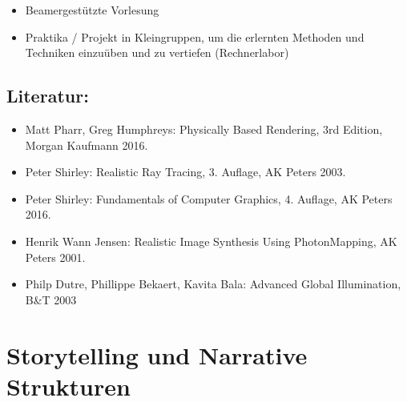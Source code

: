\begin{itemize}
\tightlist
\item
  Beamergestützte Vorlesung
\item
  Praktika / Projekt in Kleingruppen, um die erlernten Methoden und
  Techniken einzuüben und zu vertiefen (Rechnerlabor)
\end{itemize}

\section*{Literatur:\label{/mi-2017/modulbeschreibungen-master/MA_VC_Modul_PhotorealistischeBildsynthese}}\label{literaturpathlabelmi-2017modulbeschreibungen-mastermaux5fvcux5fmodulux5fphotorealistischebildsynthese}

\begin{itemize}
\tightlist
\item
  Matt Pharr, Greg Humphreys: Physically Based Rendering, 3rd Edition,
  Morgan Kaufmann 2016.
\item
  Peter Shirley: Realistic Ray Tracing, 3. Auflage, AK Peters 2003.
\item
  Peter Shirley: Fundamentals of Computer Graphics, 4. Auflage, AK
  Peters 2016.
\item
  Henrik Wann Jensen: Realistic Image Synthesis Using PhotonMapping, AK
  Peters 2001.
\item
  Philp Dutre, Phillippe Bekaert, Kavita Bala: Advanced Global
  Illumination, B\&T 2003
\end{itemize}

\chapter{Storytelling und Narrative
Strukturen\label{/mi-2017/modulbeschreibungen-master/MA_VC_Modul_Storytelling}}\label{storytelling-und-narrative-strukturenpathlabelmi-2017modulbeschreibungen-mastermaux5fvcux5fmodulux5fstorytelling}

